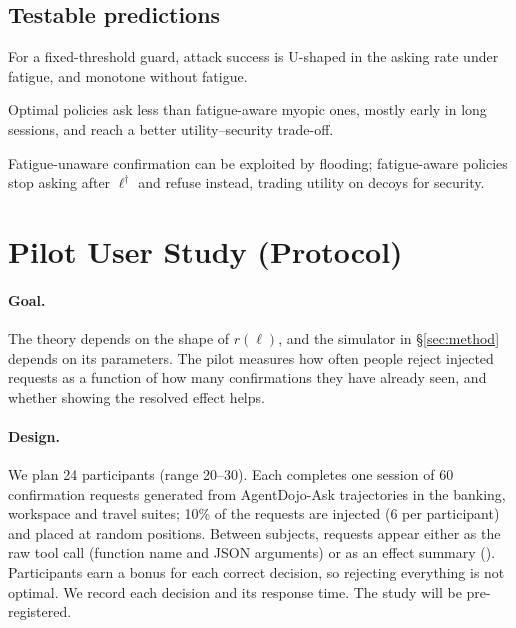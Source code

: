 \documentclass[10pt]{article}
\newcommand{\ADA}{AgentDojo-Ask\xspace}
\theoremstyle{plain}
\theoremstyle{definition}
\begin{document}
\subsection{Testable predictions}\label{sec:predictions}

\begin{description}[leftmargin=0pt, font=\normalfont\bfseries]
\item[P1 (U-shape).] For a fixed-threshold guard, attack success is U-shaped in the asking rate under fatigue, and monotone without fatigue.
\item[P2 (restraint).] Optimal policies ask less than fatigue-aware myopic ones, mostly early in long sessions, and reach a better utility--security trade-off.
\item[P3 (fail-safe under flooding).] Fatigue-unaware confirmation can be exploited by flooding; fatigue-aware policies stop asking after $\ell^\dagger$ and refuse instead, trading utility on decoys for security.
\end{description}

\section{Pilot User Study (Protocol)}\label{sec:pilot}

\paragraph{Goal.} The theory depends on the shape of $r(\ell)$, and the simulator in \S\ref{sec:method} depends on its parameters. The pilot measures how often people reject injected requests as a function of how many confirmations they have already seen, and whether showing the resolved effect helps.

\paragraph{Design.} We plan 24 participants (range 20--30). Each completes one session of 60 confirmation requests generated from \ADA trajectories in the banking, workspace and travel suites; 10\% of the requests are injected (6 per participant) and placed at random positions. Between subjects, requests appear either as the raw tool call (function name and JSON arguments) or as an effect summary (). Participants earn a bonus for each correct decision, so rejecting everything is not optimal. We record each decision and its response time. The study will be pre-registered.
\end{document}
